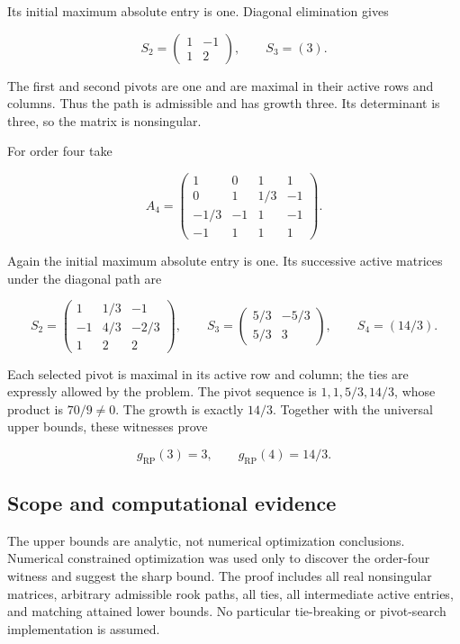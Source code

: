 \documentclass[10pt,a4paper]{article}
\begin{document}
Its initial maximum absolute entry is one. Diagonal elimination gives

\[
S_2=\begin{pmatrix}1&-1\\1&2\end{pmatrix},\qquad S_3=(3).
\]

The first and second pivots are one and are maximal in their active rows
and columns. Thus the path is admissible and has growth three. Its
determinant is three, so the matrix is nonsingular.

For order four take

\[
A_4=\begin{pmatrix}
1&0&1&1\\
0&1&1/3&-1\\
-1/3&-1&1&-1\\
-1&1&1&1
\end{pmatrix}.
\]

Again the initial maximum absolute entry is one. Its successive active
matrices under the diagonal path are

\[
S_2=\begin{pmatrix}
1&1/3&-1\\
-1&4/3&-2/3\\
1&2&2
\end{pmatrix},\qquad
S_3=\begin{pmatrix}5/3&-5/3\\5/3&3\end{pmatrix},\qquad
S_4=(14/3).
\]

Each selected pivot is maximal in its active row and column; the ties
are expressly allowed by the problem. The pivot sequence is
\(1,1,5/3,14/3\), whose product is \(70/9\ne0\). The growth is exactly
\(14/3\). Together with the universal upper bounds, these witnesses
prove

\[
\boxed{g_{\mathrm{RP}}(3)=3,\qquad g_{\mathrm{RP}}(4)=14/3.}
\]

\subsection{Scope and computational
evidence}\label{scope-and-computational-evidence}

The upper bounds are analytic, not numerical optimization conclusions.
Numerical constrained optimization was used only to discover the
order-four witness and suggest the sharp bound. The proof includes all
real nonsingular matrices, arbitrary admissible rook paths, all ties,
all intermediate active entries, and matching attained lower bounds. No
particular tie-breaking or pivot-search implementation is assumed.
\end{document}
